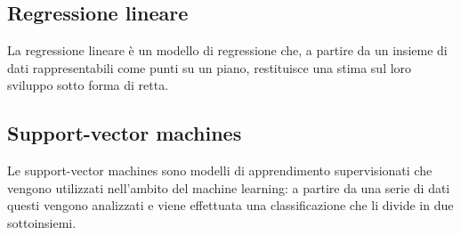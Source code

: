 	\subsection{Regressione lineare}
		La regressione lineare è un modello di regressione che, a partire da un insieme di dati rappresentabili come punti su un piano, restituisce una stima sul loro sviluppo sotto forma di retta.
	\subsection{Support-vector machines}
		Le support-vector machines sono modelli di apprendimento supervisionati che vengono utilizzati nell'ambito del machine learning\glo: a partire da una serie di dati questi vengono analizzati e viene effettuata una classificazione che li divide in due sottoinsiemi.



